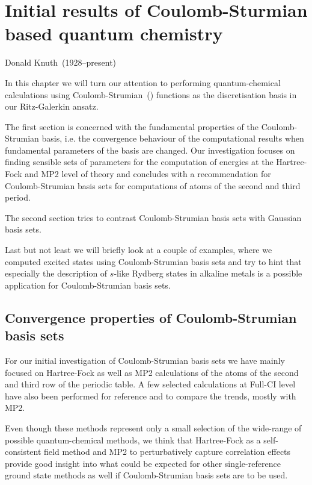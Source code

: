 \chapter[Coulomb-Sturmian based quantum chemistry]%
{Initial results of Coulomb-Sturmian based quantum chemistry}
\label{ch:CSQChem}
{Donald Knuth~(1928--present)}

In this chapter we will turn our attention to performing
quantum-chemical calculations using Coulomb-Strumian~(\CS) functions
as the discretisation basis in our Ritz-Galerkin ansatz.

The first section is concerned with the fundamental properties
of the Coulomb-Strumian basis,
i.e. the convergence behaviour of the computational results
when fundamental parameters of the basis are changed.
Our investigation focuses on finding sensible sets of parameters
for the computation of energies at the Hartree-Fock and MP2 level of theory
and concludes with a recommendation for Coulomb-Strumian basis
sets for computations of atoms of the second and third period.

The second section tries to contrast Coulomb-Strumian basis sets
with Gaussian basis sets.

Last but not least we will briefly look at a couple of examples,
where we computed excited states using Coulomb-Strumian basis sets
and try to hint that especially the description of $s$-like
Rydberg states in alkaline metals is a possible application
for Coulomb-Strumian basis sets.

\section{Convergence properties of Coulomb-Strumian basis sets}
For our initial investigation of Coulomb-Strumian basis sets
we have mainly focused on Hartree-Fock as well as MP2
calculations of the atoms of the second and third
row of the periodic table.
A few selected calculations at Full-CI level have also
been performed for reference and to compare the trends,
mostly with MP2.

Even though these methods represent only a small selection
of the wide-range of possible quantum-chemical methods,
we think that Hartree-Fock as a self-consistent field method
and MP2 to perturbatively capture correlation effects
provide good insight into what could be expected
for other single-reference ground state methods as well
if Coulomb-Strumian basis sets are to be used.

